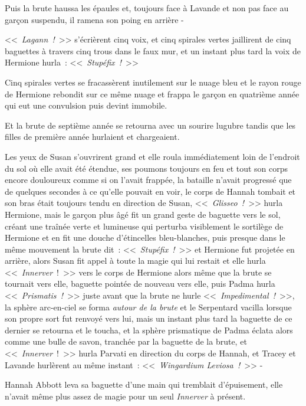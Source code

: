 Puis la brute haussa les épaules et, toujours face à Lavande et non pas face au garçon suspendu, il ramena son poing en arrière -

<<~\emph{Lagann~!}~>> s'écrièrent cinq voix, et cinq spirales vertes jaillirent de cinq baguettes à travers cinq trous dans le faux mur, et un instant plus tard la voix de Hermione hurla~: <<~\emph{Stupéfix~!}~>>

Cinq spirales vertes se fracassèrent inutilement sur le nuage bleu et le rayon rouge de Hermione rebondit sur ce même nuage et frappa le garçon en quatrième année qui eut une convulsion puis devint immobile.

Et la brute de septième année se retourna avec un sourire lugubre tandis que les filles de première année hurlaient et chargeaient.

\later

Les yeux de Susan s'ouvrirent grand et elle roula immédiatement loin de l'endroit du sol où elle avait été étendue, ses poumons toujours en feu et tout son corps encore douloureux comme si on l'avait frappée, la bataille n'avait progressé que de quelques secondes à ce qu'elle pouvait en voir, le corps de Hannah tombait et son bras était toujours tendu en direction de Susan, <<~\emph{Glisseo~!}~>> hurla Hermione, mais le garçon plus âgé fit un grand geste de baguette vers le sol, créant une traînée verte et lumineuse qui perturba visiblement le sortilège de Hermione et en fit une douche d'étincelles bleu-blanches, puis presque dans le même mouvement la brute dit~: <<~\emph{Stupéfix~!}~>> et Hermione fut projetée en arrière, alors Susan fit appel à toute la magie qui lui restait et elle hurla <<~\emph{Innerver}~!~>> vers le corps de Hermione alors même que la brute se tournait vers elle, baguette pointée de nouveau vers elle, puis Padma hurla <<~\emph{Prismatis~!}~>> juste avant que la brute ne hurle <<~\emph{Impedimental~!}~>>, la sphère arc-en-ciel se forma \emph{autour de la brute} et le Serpentard vacilla lorsque son propre sort fut renvoyé vers lui, mais un instant plus tard la baguette de ce dernier se retourna et le toucha, et la sphère prismatique de Padma éclata alors comme une bulle de savon, tranchée par la baguette de la brute, et <<~\emph{Innerver}~!~>> hurla Parvati en direction du corps de Hannah, et Tracey et Lavande hurlèrent au même instant~: <<~\emph{Wingardium Leviosa~!}~>> -

\later

Hannah Abbott leva sa baguette d'une main qui tremblait d'épuisement, elle n'avait même plus assez de magie pour un seul \emph{Innerver} à présent.

